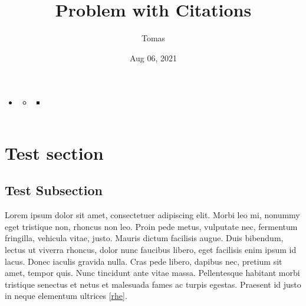 \documentclass[a4paper,10pt,openany,oneside,english]{sphinxmanual}
\title{Problem with Citations}
\date{Aug 06, 2021}
\author{Tomas}
\begin{document}
\pagestyle{empty}
\sphinxmaketitle
\pagestyle{plain}
\sphinxtableofcontents
\pagestyle{normal}
\label{\detokenize{guides/operational/cso/citations::doc}}


\begin{sphinxShadowBox}
\begin{itemize}
\item {} 
\sphinxAtStartPar
{}\label{\detokenize{guides/operational/cso/citations:id6}}{\hyperref[\detokenize{guides/operational/cso/citations:citations}]{}}
\begin{itemize}
\item {} 
\sphinxAtStartPar
{}\label{\detokenize{guides/operational/cso/citations:id7}}{\hyperref[\detokenize{guides/operational/cso/citations:test-section}]{}}
\begin{itemize}
\item {} 
\sphinxAtStartPar
{}\label{\detokenize{guides/operational/cso/citations:id8}}{\hyperref[\detokenize{guides/operational/cso/citations:test-subsection}]{}}

\end{itemize}

\end{itemize}

\end{itemize}
\end{sphinxShadowBox}


\chapter{Test section}
\label{\detokenize{guides/operational/cso/citations:test-section}}

\section{Test Subsection}
\label{\detokenize{guides/operational/cso/citations:test-subsection}}
\sphinxAtStartPar
Lorem ipsum dolor sit amet, consectetuer adipiscing elit. Morbi leo mi, nonummy eget tristique non, rhoncus non leo.
Proin pede metus, vulputate nec, fermentum fringilla, vehicula vitae, justo. Mauris dictum facilisis augue. Duis bibendum,
lectus ut viverra rhoncus, dolor nunc faucibus libero, eget facilisis enim ipsum id lacus. Donec iaculis gravida nulla.
Cras pede libero, dapibus nec, pretium sit amet, tempor quis. Nunc tincidunt ante vitae massa. Pellentesque habitant
morbi tristique senectus et netus et malesuada fames ac turpis egestas.
Praesent id justo in neque elementum ultrices {[}\hyperlink{cite.guides/operational/cso/citations:id5}{rhe}{]}.
\end{document}
